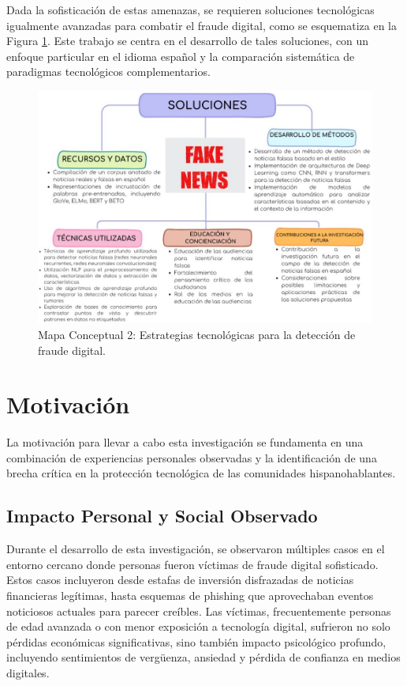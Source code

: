 Dada la sofisticación de estas amenazas, se requieren soluciones tecnológicas igualmente avanzadas para combatir el fraude digital, como se esquematiza en la Figura \ref{fig:mapa_soluciones}. Este trabajo se centra en el desarrollo de tales soluciones, con un enfoque particular en el idioma español y la comparación sistemática de paradigmas tecnológicos complementarios.

\begin{figure}[h!]
    \centering
    \includegraphics[width=\textwidth]{Imagenes/mapaConceptual2.png}
    \caption{Mapa Conceptual 2: Estrategias tecnológicas para la detección de fraude digital.}
    \label{fig:mapa_soluciones}
\end{figure}

\section{Motivación}

La motivación para llevar a cabo esta investigación se fundamenta en una combinación de experiencias personales observadas y la identificación de una brecha crítica en la protección tecnológica de las comunidades hispanohablantes.

\subsection{Impacto Personal y Social Observado}

Durante el desarrollo de esta investigación, se observaron múltiples casos en el entorno cercano donde personas fueron víctimas de fraude digital sofisticado. Estos casos incluyeron desde estafas de inversión disfrazadas de noticias financieras legítimas, hasta esquemas de phishing que aprovechaban eventos noticiosos actuales para parecer creíbles. Las víctimas, frecuentemente personas de edad avanzada o con menor exposición a tecnología digital, sufrieron no solo pérdidas económicas significativas, sino también impacto psicológico profundo, incluyendo sentimientos de vergüenza, ansiedad y pérdida de confianza en medios digitales.


